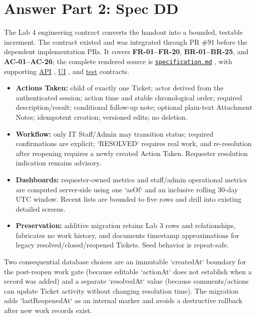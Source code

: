 \documentclass[10pt,a4paper]{article}
\newcommand{\answerpart}[2]{%
  \clearpage
  \section*{Answer Part #1: #2}%
  \addcontentsline{toc}{section}{Answer Part #1: #2}%
}
\newcommand{\reportlink}[2]{%
  \href{https://github.com/ovenmakemeheat/toktickit/blob/docs/lab4-docs/#1}{#2}%
}
\begin{document}
\answerpart{2}{Spec DD}

The Lab 4 engineering contract converts the handout into a bounded, testable increment. The contract existed and was integrated through PR \#91 before the dependent implementation PRs. It covers \textbf{FR-01--FR-20}, \textbf{BR-01--BR-25}, and \textbf{AC-01--AC-26}; the complete rendered source is \reportlink{docs/lab-04/specification.md}{\texttt{specification.md}}, with supporting \reportlink{docs/lab-04/api-spec.md}{API}, \reportlink{docs/lab-04/ui-spec.md}{UI}, and \reportlink{docs/lab-04/tests.md}{test} contracts.

\begin{itemize}
  \item \textbf{Actions Taken:} child of exactly one Ticket; actor derived from the authenticated session; action time and stable chronological order; required description/result; conditional follow-up note; optional plain-text Attachment Notes; idempotent creation; versioned edits; no deletion.
  \item \textbf{Workflow:} only IT Staff/Admin may transition status; required confirmations are explicit; `RESOLVED` requires real work, and re-resolution after reopening requires a newly created Action Taken. Requester resolution indication remains advisory.
  \item \textbf{Dashboards:} requester-owned metrics and staff/admin operational metrics are computed server-side using one `asOf` and an inclusive rolling 30-day UTC window. Recent lists are bounded to five rows and drill into existing detailed screens.
  \item \textbf{Preservation:} additive migration retains Lab 3 rows and relationships, fabricates no work history, and documents timestamp approximations for legacy resolved/closed/reopened Tickets. Seed behavior is repeat-safe.
\end{itemize}

Two consequential database choices are an immutable `createdAt` boundary for the post-reopen work gate (because editable `actionAt` does not establish when a record was added) and a separate `resolvedAt` value (because comments/actions can update Ticket activity without changing resolution time). The migration adds `lastReopenedAt` as an internal marker and avoids a destructive rollback after new work records exist.
\end{document}
